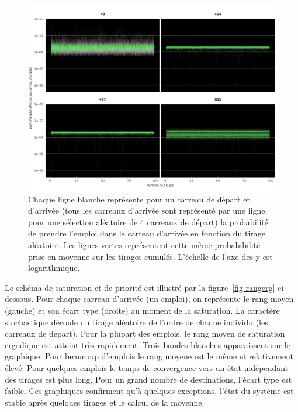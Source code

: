 \documentclass[
  10pt,
  a4paper,
  numbers=noendperiod,
  DIV=12]{scrartcl}
\begin{document}
\begin{figure}[htb]

{\centering \includegraphics[width=1\textwidth,height=\textheight]{output/gemploi_erg.png}

}

\caption[Affectation de l'emploi pour des carreaux de
départ]{\label{fig-emperg}Chaque ligne blanche représente pour un
carreau de départ et d'arrivée (tous les carreaux d'arrivée sont
représenté par une ligne, pour une sélection aléatoire de 4 carreaux de
départ) la probabilité de prendre l'emploi dans le carreau d'arrivée en
fonction du tirage aléatoire. Les lignes vertes représentent cette même
probabibilité prise en moyenne sur les tirages cumulés. L'échelle de
l'axe des y est logarithmique.}

\end{figure}

Le schéma de saturation et de priorité est illustré par la
figure~\ref{fig-rangerg} ci-dessous. Pour chaque carreau d'arrivée (un
emploi), on représente le rang moyen (gauche) et son écart type (droite)
au moment de la saturation. La caractère stochastique découle du tirage
aléatoire de l'ordre de chaque individu (les carreaux de départ). Pour
la plupart des emplois, le rang moyen de saturation ergodique est
atteint très rapidement. Trois bandes blanches apparaissent sur le
graphique. Pour beaucoup d'emplois le rang moyene est le même et
relativement élevé. Pour quelques emplois le temps de convergence vers
un état indépendant des tirages est plus long. Pour un grand nombre de
destinations, l'écart type est faible. Ces graphiques confirment qu'à
quelques exceptions, l'état du système est stable après quelques tirages
et le calcul de la moyenne.
\end{document}
